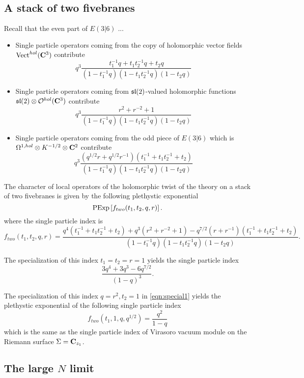 \documentclass[11pt]{amsart}
\begin{document}
\subsection{A stack of two fivebranes}

\parsec[]

Recall that the even part of $E(3|6)$ ... 

\begin{itemize}
\item Single particle operators coming from the copy of holomorphic vector fields $\operatorname{Vect}^{hol}(\mathbf{C}^3)$ contribute
\[
q^3 \frac{t_1^{-1} q + t_1 t_2^{-1} q + t_2 q }{(1-t_1^{-1}q) (1-t_1 t_2^{-1} q) (1-t_2 q)} 
\]
\item Single particle operators coming from $\mathfrak{sl}(2)$-valued holomorphic functions $\mathfrak{sl}(2) \otimes \mathcal O^{hol}(\mathbf{C}^3)$ contribute
\[
q^3\frac{r^2 + r^{-2} + 1}{(1-t_1^{-1}q) (1-t_1 t_2^{-1} q) (1-t_2 q)} 
\]
\item Single particle operators coming from the odd piece of $E(3|6)$ which is $\Omega^{1,hol} \otimes K^{-1/2} \otimes \mathbf{C}^2$ contribute
\[
q^{3}\frac{(q^{1/2} r + q^{1/2} r^{-1})(t_1^{-1} + t_1t_2^{-1} + t_2)}{(1-t_1^{-1}q) (1-t_1 t_2^{-1} q) (1-t_2 q)}
\]
\end{itemize}

\begin{conj}
The character of local operators of the holomorphic twist of the theory on a stack of two fivebranes is given by the following plethystic exponential
\[
{\rm PExp} \left[f_{two} (t_1,t_2,q,r) \right] .
\]
where the single particle index is
\[
f_{two} (t_1,t_2,q,r) = \frac{q^4(t_1^{-1} + t_1 t_2^{-1}  + t_2) + q^3 (r^2 + r^{-2} + 1) - q^{7/2} (r + r^{-1})(t_1^{-1} + t_1t_2^{-1} + t_2)}{(1-t_1^{-1}q) (1-t_1 t_2^{-1} q) (1-t_2 q)} .
\]
\end{conj}

\parsec[]

The specialization of this index $t_1=t_2=r=1$ yields the single particle index
\[
\frac{3q^4 + 3 q^3 - 6 q^{7/2}}{(1-q)^3}. 
\]

\parsec[]

The specialization of this index $q=r^2, t_2=1$ in \eqref{eqn:special1} yields the plethystic exponential of the following single particle index
\[
f_{two}(t_1, 1, q, q^{1/2}) = \frac{q^2}{1-q} 
\]
which is the same as the single particle index of Virasoro vacuum module on the Riemann surface $\Sigma = \mathbf{C}_{z_1}$. 

\subsection{The large $N$ limit}
\end{document}
